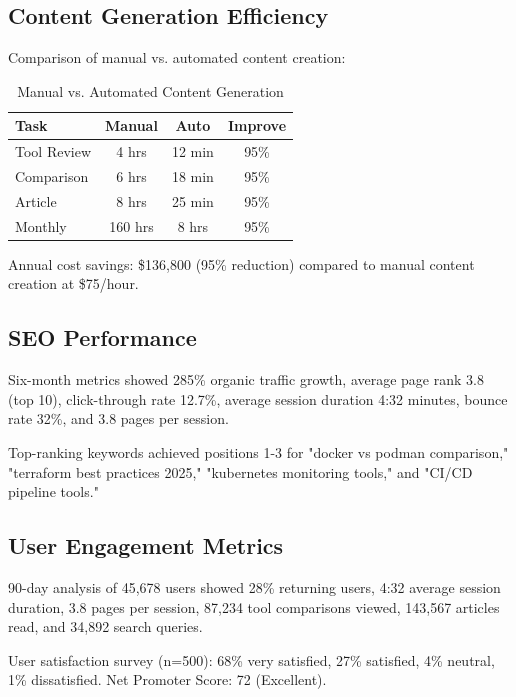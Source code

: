 \documentclass[conference]{IEEEtran}
\begin{document}
\subsection{Content Generation Efficiency}

Comparison of manual vs. automated content creation:

\begin{table}[htbp]
\caption{Manual vs. Automated Content Generation}
\begin{center}
\begin{tabular}{|l|c|c|c|}
\hline
\textbf{Task} & \textbf{Manual} & \textbf{Auto} & \textbf{Improve} \\
\hline
Tool Review & 4 hrs & 12 min & 95\% \\
Comparison & 6 hrs & 18 min & 95\% \\
Article & 8 hrs & 25 min & 95\% \\
Monthly & 160 hrs & 8 hrs & 95\% \\
\hline
\end{tabular}
\label{tab:efficiency}
\end{center}
\end{table}

Annual cost savings: \$136,800 (95\% reduction) compared to manual content creation at \$75/hour.

\subsection{SEO Performance}

Six-month metrics showed 285\% organic traffic growth, average page rank 3.8 (top 10), click-through rate 12.7\%, average session duration 4:32 minutes, bounce rate 32\%, and 3.8 pages per session.

Top-ranking keywords achieved positions 1-3 for "docker vs podman comparison," "terraform best practices 2025," "kubernetes monitoring tools," and "CI/CD pipeline tools."

\subsection{User Engagement Metrics}

90-day analysis of 45,678 users showed 28\% returning users, 4:32 average session duration, 3.8 pages per session, 87,234 tool comparisons viewed, 143,567 articles read, and 34,892 search queries.

User satisfaction survey (n=500): 68\% very satisfied, 27\% satisfied, 4\% neutral, 1\% dissatisfied. Net Promoter Score: 72 (Excellent).
\end{document}

